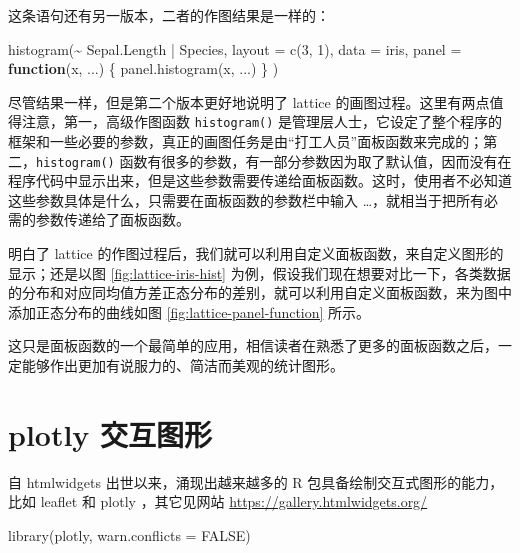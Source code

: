 \documentclass[
  b5paper,
  UTF8,twoside]{book}
\newenvironment{Shaded}{\begin{snugshade}}{\end{snugshade}}
\newcommand{\AttributeTok}[1]{\textcolor[rgb]{0.77,0.63,0.00}{#1}}
\newcommand{\ConstantTok}[1]{\textcolor[rgb]{0.00,0.00,0.00}{#1}}
\newcommand{\ControlFlowTok}[1]{\textcolor[rgb]{0.13,0.29,0.53}{\textbf{#1}}}
\newcommand{\DecValTok}[1]{\textcolor[rgb]{0.00,0.00,0.81}{#1}}
\newcommand{\FunctionTok}[1]{\textcolor[rgb]{0.00,0.00,0.00}{#1}}
\newcommand{\NormalTok}[1]{#1}
\newcommand{\SpecialCharTok}[1]{\textcolor[rgb]{0.00,0.00,0.00}{#1}}
\begin{document}
这条语句还有另一版本，二者的作图结果是一样的：

\begin{Shaded}
\begin{Highlighting}[]
\FunctionTok{histogram}\NormalTok{(}\SpecialCharTok{\textasciitilde{}}\NormalTok{ Sepal.Length }\SpecialCharTok{|}\NormalTok{ Species,}
  \AttributeTok{layout =} \FunctionTok{c}\NormalTok{(}\DecValTok{3}\NormalTok{, }\DecValTok{1}\NormalTok{), }\AttributeTok{data =}\NormalTok{ iris,}
  \AttributeTok{panel =} \ControlFlowTok{function}\NormalTok{(x, ...) \{}
    \FunctionTok{panel.histogram}\NormalTok{(x, ...)}
\NormalTok{  \}}
\NormalTok{)}
\end{Highlighting}
\end{Shaded}

尽管结果一样，但是第二个版本更好地说明了 lattice 的画图过程。这里有两点值得注意，第一，高级作图函数 \texttt{histogram()} 是管理层人士，它设定了整个程序的框架和一些必要的参数，真正的画图任务是由``打工人员''面板函数来完成的；第二，\texttt{histogram()} 函数有很多的参数，有一部分参数因为取了默认值，因而没有在程序代码中显示出来，但是这些参数需要传递给面板函数。这时，使用者不必知道这些参数具体是什么，只需要在面板函数的参数栏中输入 \ldots，就相当于把所有必需的参数传递给了面板函数。

明白了 lattice 的作图过程后，我们就可以利用自定义面板函数，来自定义图形的显示；还是以图 \ref{fig:lattice-iris-hist} 为例，假设我们现在想要对比一下，各类数据的分布和对应同均值方差正态分布的差别，就可以利用自定义面板函数，来为图中添加正态分布的曲线如图 \ref{fig:lattice-panel-function} 所示。

这只是面板函数的一个最简单的应用，相信读者在熟悉了更多的面板函数之后，一定能够作出更加有说服力的、简洁而美观的统计图形。

\hypertarget{sec:interactive-graphics}{%
\section{plotly 交互图形}\label{sec:interactive-graphics}}

自 htmlwidgets \citep{htmlwidgets} 出世以来，涌现出越来越多的 R 包具备绘制交互式图形的能力，比如 leaflet \citep{leaflet} 和 plotly \citep{plotly}，其它见网站 \url{https://gallery.htmlwidgets.org/}

\begin{Shaded}
\begin{Highlighting}[]
\FunctionTok{library}\NormalTok{(plotly, }\AttributeTok{warn.conflicts =} \ConstantTok{FALSE}\NormalTok{)}
\end{Highlighting}
\end{Shaded}
\end{document}
